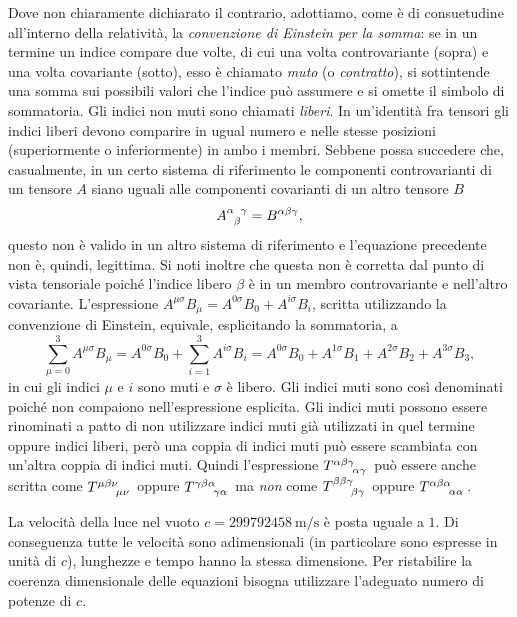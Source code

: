 Dove non chiaramente dichiarato il contrario, adottiamo, come è di consuetudine
all'interno della relatività, la 
\emph{convenzione di Einstein per la somma}: se in un termine un indice compare
due volte, di cui una volta controvariante (sopra) e una volta covariante
(sotto), esso è chiamato \emph{muto} (o \emph{contratto}), si
sottintende una somma sui possibili valori che l'indice può assumere e si omette
il simbolo di sommatoria.  Gli indici non muti sono chiamati
\emph{liberi}.  In un'identità fra tensori gli indici
liberi devono comparire in ugual numero e nelle stesse posizioni (superiormente
o inferiormente) in ambo i membri.  Sebbene possa succedere che, casualmente, in
un certo sistema di riferimento le componenti controvarianti di un tensore $A$
siano uguali alle componenti covarianti di un altro tensore $B$
\begin{equation}
  \tensor{A}{^{\alpha}_{\beta}^{\gamma}} = B^{\alpha\beta\gamma},
\end{equation}
questo non è valido in un altro sistema di riferimento e l'equazione precedente
non è, quindi, legittima.  Si noti inoltre che questa non è corretta dal punto
di vista tensoriale poiché l'indice libero $\beta$ è in un membro controvariante
e nell'altro covariante.  L'espressione
$A^{\mu\sigma}B_{\mu} = A^{0\sigma}B_{0} + A^{i\sigma}B_{i}$, scritta
utilizzando la convenzione di Einstein, equivale, esplicitando la sommatoria, a
\begin{equation}
  \sum_{\mu=0}^{3} A^{\mu\sigma}B_{\mu} = A^{0\sigma}B_{0} + \sum_{i=1}^{3}
  A^{i\sigma}B_{i} = A^{0\sigma}B_{0} + A^{1\sigma}B_{1} + A^{2\sigma}B_{2} +
  A^{3\sigma}B_{3},
\end{equation}
in cui gli indici $\mu$ e $i$ sono muti e $\sigma$ è libero.  Gli indici muti
sono così denominati poiché non compaiono nell'espressione esplicita.  Gli
indici muti possono essere rinominati a patto di non utilizzare indici muti già
utilizzati in quel termine oppure indici liberi, però una coppia di indici muti
può essere scambiata con un'altra coppia di indici muti.  Quindi l'espressione
$\tensor{T}{^{\alpha\beta\gamma}_{\alpha\gamma}}$ può essere anche scritta come
$\tensor{T}{^{\mu\beta\nu}_{\mu\nu}}$ oppure
$\tensor{T}{^{\gamma\beta\alpha}_{\gamma\alpha}}$ ma \emph{non} come
$\tensor{T}{^{\beta\beta\gamma}_{\beta\gamma}}$ oppure
$\tensor{T}{^{\alpha\beta\alpha}_{\alpha\alpha}}$.

La velocità della luce nel vuoto $c = \SI{299792458}{\metre\per\second}$ è posta
uguale a $1$.  Di conseguenza tutte le velocità sono adimensionali (in
particolare sono espresse in unità di $c$), lunghezze e tempo hanno la stessa
dimensione.  Per ristabilire la coerenza dimensionale delle equazioni bisogna
utilizzare l'adeguato numero di potenze di $c$.

